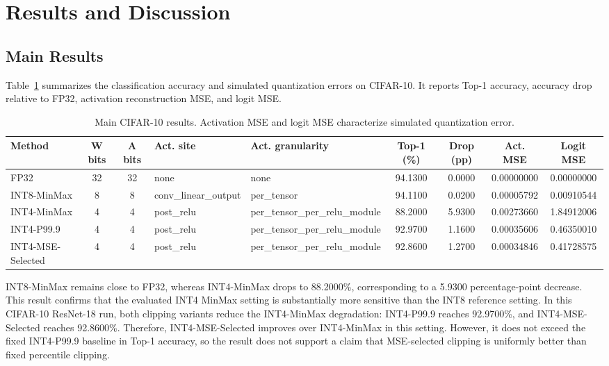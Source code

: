 
\section{Results and Discussion}
\label{sec:results_discussion}

\subsection{Main Results}
\label{subsec:main_quantization_results}

Table~\ref{tab:main_results} summarizes the classification accuracy and simulated quantization errors on CIFAR-10. It reports Top-1 accuracy, accuracy drop relative to FP32, activation reconstruction MSE, and logit MSE.

\begin{table}[t]
\centering
\caption{Main CIFAR-10 results. Activation MSE and logit MSE characterize simulated quantization error.}
\label{tab:main_results}
\begin{tabular}{l c c l l c c c c}
\hline
\textbf{Method} & \textbf{W bits} & \textbf{A bits} & \textbf{Act. site} & \textbf{Act. granularity} & \textbf{Top-1 (\%)} & \textbf{Drop (pp)} & \textbf{Act. MSE} & \textbf{Logit MSE} \\
\hline
FP32 & 32 & 32 & none & none & 94.1300 & 0.0000 & 0.00000000 & 0.00000000 \\
INT8-MinMax & 8 & 8 & conv\_linear\_output & per\_tensor & 94.1100 & 0.0200 & 0.00005792 & 0.00910544 \\
INT4-MinMax & 4 & 4 & post\_relu & per\_tensor\_per\_relu\_module & 88.2000 & 5.9300 & 0.00273660 & 1.84912006 \\
INT4-P99.9 & 4 & 4 & post\_relu & per\_tensor\_per\_relu\_module & 92.9700 & 1.1600 & 0.00035606 & 0.46350010 \\
INT4-MSE-Selected & 4 & 4 & post\_relu & per\_tensor\_per\_relu\_module & 92.8600 & 1.2700 & 0.00034846 & 0.41728575 \\
\hline
\end{tabular}
\end{table}

INT8-MinMax remains close to FP32, whereas INT4-MinMax drops to 88.2000\%, corresponding to a 5.9300 percentage-point decrease. This result confirms that the evaluated INT4 MinMax setting is substantially more sensitive than the INT8 reference setting. In this CIFAR-10 ResNet-18 run, both clipping variants reduce the INT4-MinMax degradation: INT4-P99.9 reaches 92.9700\%, and INT4-MSE-Selected reaches 92.8600\%. Therefore, INT4-MSE-Selected improves over INT4-MinMax in this setting. However, it does not exceed the fixed INT4-P99.9 baseline in Top-1 accuracy, so the result does not support a claim that MSE-selected clipping is uniformly better than fixed percentile clipping.

